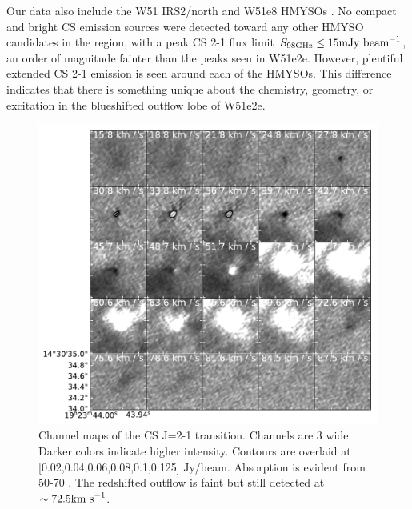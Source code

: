 \documentclass[twocolumn]{aastex62}
\begin{document}
Our data also include the W51 IRS2/north and W51e8 HMYSOs
\citep{Ginsburg2017a}.  No compact and bright CS emission sources were detected
toward any other HMYSO candidates in the region, with a peak CS 2-1 flux limit
${S_{98 \mathrm{GHz}} \leq 15 \mathrm{mJy~\textrm{beam}^{-1}}}$, an order of magnitude
fainter than the peaks seen in W51e2e.  However, plentiful extended CS 2-1
emission is seen around each of the HMYSOs.  This difference indicates that
there is something unique about the chemistry, geometry, or excitation in the
blueshifted outflow lobe of W51e2e.


\begin{figure}
    \includegraphics[]{figures/CS_maser_channel_maps.pdf}
    \caption{Channel maps of the CS J=2-1 transition.  Channels are 3 \kms
    wide.  Darker colors indicate higher intensity.  Contours are overlaid at
    [0.02,0.04,0.06,0.08,0.1,0.125] Jy/beam.  Absorption is evident from 50-70
    \kms.  The redshifted outflow is faint but still detected at
    $\sim72.5\textrm{km~s}^{-1}$.
    }
    \label{fig:channelmaps}
\end{figure}
\end{document}
